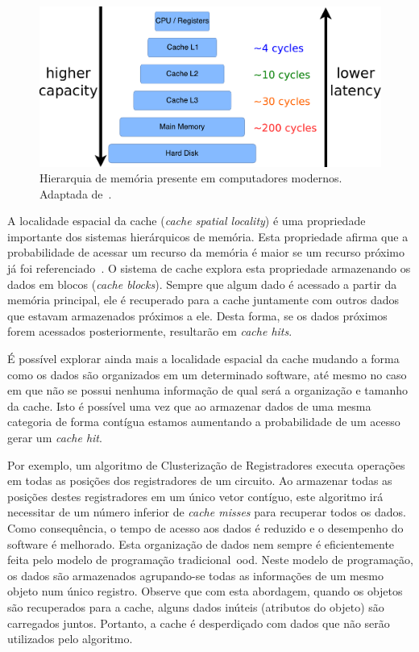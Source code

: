 \begin{figure}[h]
    \centering
    \includegraphics[width=0.7\linewidth]{img/tecnica/memoryHierarchy}
    \caption[Hierarquia de memória]{Hierarquia de memória presente em computadores modernos. Adaptada de~\cite{patterson2013computer}.}
    \label{fig:memoryHierarchy}
\end{figure}


A localidade espacial da cache (\textit{cache spatial locality}) é uma propriedade importante dos sistemas hierárquicos de memória. Esta propriedade afirma que a probabilidade de acessar um recurso da memória é maior se um recurso próximo já foi referenciado~\cite{patterson2013computer}. O sistema de cache explora esta propriedade armazenando os dados em blocos (\textit{cache blocks}). Sempre que algum dado é acessado a partir da memória principal, ele é recuperado para a cache juntamente com outros dados que estavam armazenados próximos a ele. Desta forma, se os dados próximos forem acessados posteriormente, resultarão em \textit{cache hits}.

É possível explorar ainda mais a localidade espacial da cache mudando a forma como os dados são organizados em um determinado software, até mesmo no caso em que não se possui nenhuma informação de qual será a organização e tamanho da cache.
Isto é possível uma vez que ao armazenar dados de uma mesma categoria de forma contígua estamos aumentando a probabilidade de um acesso gerar um \textit{cache hit}.

Por exemplo, um algoritmo de Clusterização de Registradores executa operações em todas as posições dos registradores de um circuito.
Ao armazenar todas as posições destes registradores em um único vetor contíguo, este algoritmo irá necessitar de um número inferior de \textit{cache misses} para recuperar todos os dados.
Como consequência, o tempo de acesso aos dados é reduzido e o desempenho do software é melhorado. Esta organização de dados nem sempre é eficientemente feita pelo modelo de programação tradicional~\ac{ood}.
Neste modelo de programação, os dados são armazenados agrupando-se todas as informações de um mesmo objeto num único registro.
Observe que com esta abordagem, quando os objetos são recuperados para a cache, alguns dados inúteis (atributos do objeto) são carregados juntos. Portanto, a cache é desperdiçado com dados que não serão utilizados pelo algoritmo.

